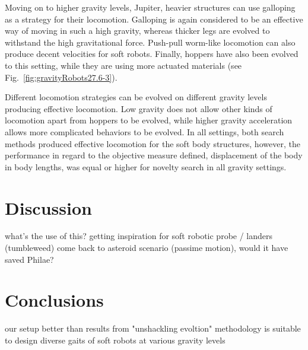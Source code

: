 \documentclass{sig-alternate}
\begin{document}
Moving on to higher gravity levels, Jupiter, heavier structures can use galloping as a strategy for their locomotion. Galloping is again considered to be an effective way of moving in such a high gravity, whereas thicker legs are evolved to withstand the high gravitational force. Push-pull worm-like locomotion can also produce decent velocities for soft robots. Finally, hoppers have also been evolved to this setting, while they are using more actuated materials (see Fig.~\ref{fig:gravityRobots27.6-3}).


Different locomotion strategies can be evolved on different gravity levels producing effective locomotion. Low gravity does not allow other kinds of locomotion apart from hoppers to be evolved, while higher gravity acceleration allows more complicated behaviors to be evolved. In all settings, both search methods produced effective locomotion for the soft body structures, however, the performance in regard to the objective measure defined, displacement of the body in body lengths, was equal or higher for novelty search in all gravity settings.



\section{Discussion}
what's the use of this?
getting inspiration for soft robotic probe / landers (tumbleweed)
come back to asteroid scenario (passime motion), would it have saved Philae?


\section{Conclusions}
our setup better than results from "unshackling evoltion"
methodology is suitable to design diverse gaits of soft robots at various gravity levels
\end{document}
